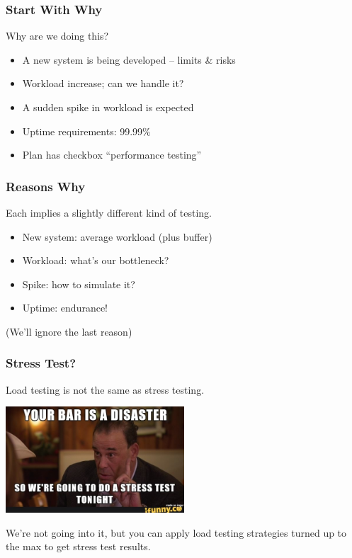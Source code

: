 \begin{frame}
\frametitle{Start With Why}
Why are we doing this?

\begin{itemize}
	\item A new system is being developed -- limits \& risks
	\item Workload increase; can we handle it?
	\item A sudden spike in workload is expected
	\item Uptime requirements: 99.99\%
	\item Plan has checkbox ``performance testing''
\end{itemize}



\end{frame}

\begin{frame}
\frametitle{Reasons Why}

Each implies a slightly different kind of testing.

\begin{itemize}
	\item New system: average workload (plus buffer)
	\item Workload: what's our bottleneck?
	\item Spike: how to simulate it?
	\item Uptime: endurance!
\end{itemize}

(We'll ignore the last reason)

\end{frame}

\begin{frame}
\frametitle{Stress Test?}

Load testing is not the same as \alert{stress testing}.

\begin{center}
  \includegraphics[width=0.5\textwidth]{images/barrescue.jpg}
\end{center}

We're not going into it, but you can apply load testing strategies turned up to the max to get stress test results.

\end{frame}

